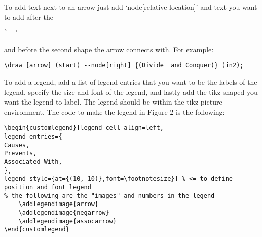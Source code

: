 \documentclass[12pt]{article}
\makeatletter
\newenvironment{customlegend}[1][]{%
    \begingroup
    \csname pgfplots@init@cleared@structures\endcsname
    \pgfplotsset{#1}%
}{%
    \csname pgfplots@createlegend\endcsname
    \endgroup
}%
\def\addlegendimage{\csname pgfplots@addlegendimage\endcsname}
\makeatother
\begin{document}
To add text next to an arrow just add `node[relative location]' and {text you want to add} after the 
\begin{verbatim}`--'\end{verbatim}
and before the second shape the arrow connects with. For example: \begin{verbatim}
\draw [arrow] (start) --node[right] {(Divide  and Conquer)} (in2);
\end{verbatim}

To add a legend, add a list of legend entries that you want to be the labels of the legend, specify the size and font of the legend, and lastly add the tikz shaped you want the legend to label. The legend should be within the tikz picture environment. The code to make the legend in 
Figure 2 is the following:
\begin{verbatim}
\begin{customlegend}[legend cell align=left,
legend entries={
Causes,
Prevents,
Associated With,
},
legend style={at={(10,-10)},font=\footnotesize}] % <= to define position and font legend
% the following are the "images" and numbers in the legend
	\addlegendimage{arrow}
	\addlegendimage{negarrow}
	\addlegendimage{assocarrow}
\end{customlegend}
\end{verbatim}
\end{document}
